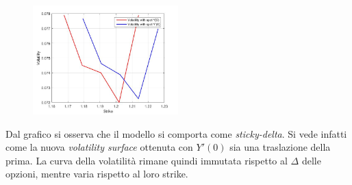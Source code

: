 \documentclass[11pt]{article}
\begin{document}
\begin{figure}[H]
\centering
\includegraphics[width=0.5\textwidth]{sticky_delta}
\end{figure}
Dal grafico si osserva che il modello si comporta come \textit{sticky-delta}. Si vede infatti come la nuova \textit{volatility surface} ottenuta con $Y'(0)$ sia una traslazione della prima. La curva della volatilità rimane quindi immutata rispetto al $\Delta$ delle opzioni, mentre varia rispetto al loro strike.
\end{document}
